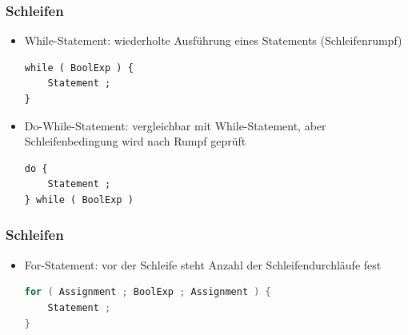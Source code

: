 \documentclass{beamer}
\begin{document}

\begin{frame}[fragile] \frametitle{Schleifen}
	\begin{itemize}
		\item While-Statement: wiederholte Ausführung eines Statements (Schleifenrumpf)
\begin{lstlisting}
while ( BoolExp ) {
	Statement ;
}
\end{lstlisting}
		\item Do-While-Statement: vergleichbar mit While-Statement, aber Schleifenbedingung wird nach Rumpf geprüft
\begin{lstlisting}
do {
	Statement ;
} while ( BoolExp )
\end{lstlisting}

	\end{itemize}
\end{frame}


\begin{frame}[fragile] \frametitle{Schleifen}
	\begin{itemize}
		\item For-Statement: vor der Schleife steht Anzahl der Schleifendurchläufe fest
\begin{lstlisting}[language=C]
for ( Assignment ; BoolExp ; Assignment ) {
	Statement ;
}
\end{lstlisting}		
	\end{itemize}
\end{frame}

\end{document}
